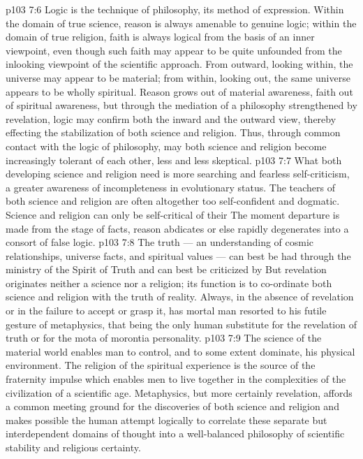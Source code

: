 \vs p103 7:6 Logic is the technique of philosophy, its method of expression. Within the domain of true science, reason is always amenable to genuine logic; within the domain of true religion, faith is always logical from the basis of an inner viewpoint, even though such faith may appear to be quite unfounded from the inlooking viewpoint of the scientific approach. From outward, looking within, the universe may appear to be material; from within, looking out, the same universe appears to be wholly spiritual. Reason grows out of material awareness, faith out of spiritual awareness, but through the mediation of a philosophy strengthened by revelation, logic may confirm both the inward and the outward view, thereby effecting the stabilization of both science and religion. Thus, through common contact with the logic of philosophy, may both science and religion become increasingly tolerant of each other, less and less skeptical.
\vs p103 7:7 What both developing science and religion need is more searching and fearless self\hyp{}criticism, a greater awareness of incompleteness in evolutionary status. The teachers of both science and religion are often altogether too self\hyp{}confident and dogmatic. Science and religion can only be self\hyp{}critical of their  The moment departure is made from the stage of facts, reason abdicates or else rapidly degenerates into a consort of false logic.
\vs p103 7:8 \pc The truth --- an understanding of cosmic relationships, universe facts, and spiritual values --- can best be had through the ministry of the Spirit of Truth and can best be criticized by  But revelation originates neither a science nor a religion; its function is to co\hyp{}ordinate both science and religion with the truth of reality. Always, in the absence of revelation or in the failure to accept or grasp it, has mortal man resorted to his futile gesture of metaphysics, that being the only human substitute for the revelation of truth or for the mota of morontia personality.
\vs p103 7:9 The science of the material world enables man to control, and to some extent dominate, his physical environment. The religion of the spiritual experience is the source of the fraternity impulse which enables men to live together in the complexities of the civilization of a scientific age. Metaphysics, but more certainly revelation, affords a common meeting ground for the discoveries of both science and religion and makes possible the human attempt logically to correlate these separate but interdependent domains of thought into a well\hyp{}balanced philosophy of scientific stability and religious certainty.
